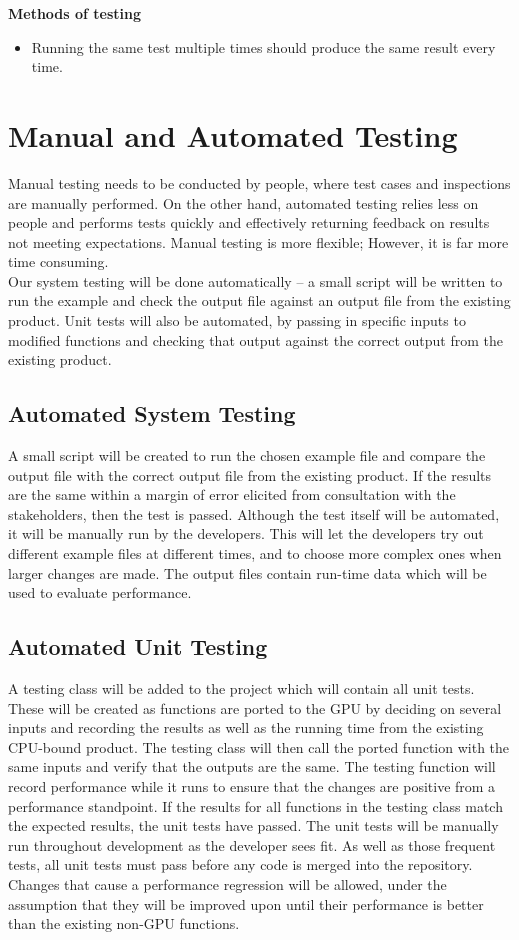 \documentclass[12pt]{article}
\begin{document}
\textbf{Methods of testing}
\begin{itemize}
\item Running the same test multiple times should produce the same result every time.
\end{itemize} 
\section{Manual and Automated Testing}
Manual testing needs to be conducted by people, where test cases and inspections are manually performed. On the other hand, automated testing relies less on people and performs tests quickly and effectively returning feedback on results not meeting expectations. Manual testing is more flexible; However, it is far more time consuming.\\

Our system testing will be done automatically -- a small script will be written to run the example and check the output file against an output file from the existing product. Unit tests will also be automated, by passing in specific inputs to modified functions and checking that output against the correct output from the existing product.

\subsection{Automated System Testing}
A small script will be created to run the chosen example file and compare the output file with the correct output file from the existing product. If the results are the same within a margin of error elicited from consultation with the stakeholders, then the test is passed. Although the test itself will be automated, it will be manually run by the developers. This will let the developers try out different example files at different times, and to choose more complex ones when larger changes are made. The output files contain run-time data which will be used to evaluate performance.

\subsection{Automated Unit Testing}
A testing class will be added to the project which will contain all unit tests. These will be created as functions are ported to the GPU by deciding on several inputs and recording the results as well as the running time from the existing CPU-bound product. The testing class will then call the ported function with the same inputs and verify that the outputs are the same. The testing function will record performance while it runs to ensure that the changes are positive from a performance standpoint. If the results for all functions in the testing class match the expected results, the unit tests have passed. The unit tests will be manually run throughout development as the developer sees fit. As well as those frequent tests, all unit tests must pass before any code is merged into the repository. Changes that cause a performance regression will be allowed, under the assumption that they will be improved upon until their performance is better than the existing non-GPU functions.
\end{document}
